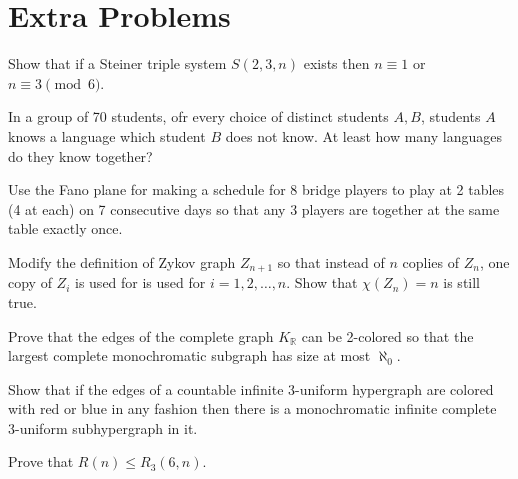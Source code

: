 \documentclass[class=article, crop=false]{standalone}
\begin{document}
\section{Extra Problems}
\begin{prob}
    Show that if a Steiner triple system $S(2,3,n)$ exists then $n \equiv 1$ or $n \equiv 3 \pmod{6}$.
\end{prob}

\begin{prob}
    In a group of 70 students, ofr every choice of distinct students $A,B$, students $A$ knows a language which student $B$ does not know. At least how many languages do they know together?
\end{prob}

\begin{prob}
    Use the Fano plane for making a schedule for 8 bridge players to play at 2 tables (4 at each) on 7 consecutive days so that any 3 players are together at the same table exactly once.
\end{prob}

\begin{prob}
    Modify the definition of Zykov graph $Z_{n+1}$ so that instead of $n$ coplies of $Z_n$, one copy of $Z_i$ is used for is used for $i=1,2,\dots,n$. Show that $\chi(Z_n)=n$ is still true.
\end{prob}

\begin{prob}
    Prove that the edges of the complete graph $K_\mathbb{R}$ can be 2-colored so that the largest complete monochromatic subgraph has size at most $\aleph_0$.
\end{prob}

\begin{prob}
    Show that if the edges of a countable infinite 3-uniform hypergraph are colored with red or blue in any fashion then there is a monochromatic infinite complete 3-uniform subhypergraph in it.
\end{prob}

\begin{prob}
    Prove that $R(n) \leq R_3(6,n)$.
\end{prob}
\end{document}
